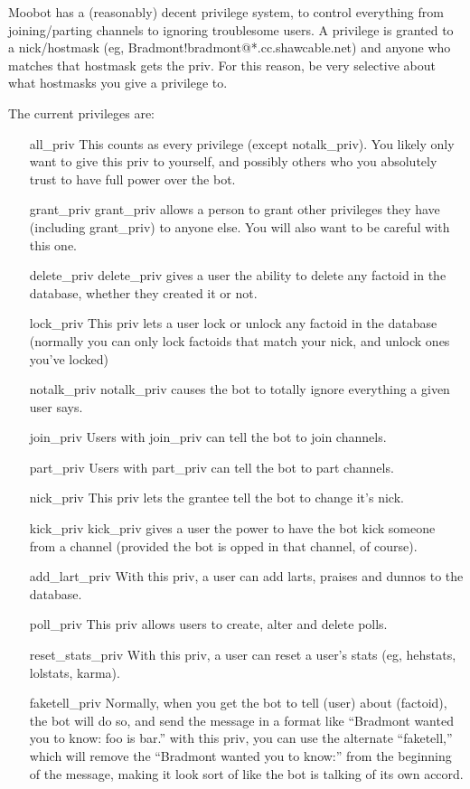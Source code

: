 \documentclass[titlepage]{article}
\begin{document}
		Moobot has a (reasonably) decent privilege system, to control
		everything from joining/parting channels to ignoring troublesome
		users.  A privilege is granted to a nick/hostmask (eg,
		Bradmont!bradmont@*.cc.shawcable.net) and anyone who matches that
		hostmask gets the priv.  For this reason, be very selective about what
		hostmasks you give a privilege to.

		The current privileges are:
		\begin{itemize}
			\item[all\_priv]  This counts as every privilege (except
			notalk\_priv).  You likely only want to give this priv to
			yourself, and possibly others who you absolutely trust to have
			full power over the bot.
			\item[grant\_priv]  grant\_priv allows a person to grant other
			privileges they have (including grant\_priv) to anyone else.  You
			will also want to be careful with this one.
			\item[delete\_priv]  delete\_priv gives a user the ability to
			delete any factoid in the database, whether they created it or
			not.
			\item[lock\_priv] This priv lets a user lock or unlock any factoid
			in the database (normally you can only lock factoids that match
			your nick, and unlock ones you've locked)
			\item[notalk\_priv] notalk\_priv causes the bot to totally ignore
			everything a given user says.
			\item[join\_priv]  Users with join\_priv can tell the bot to join
			channels.
			\item[part\_priv]  Users with part\_priv can tell the bot to part
			channels.
			\item[nick\_priv]  This priv lets the grantee tell the bot to
			change it's nick.
			\item[kick\_priv]  kick\_priv gives a user the power to have the
			bot kick someone from a channel (provided the bot is opped in that
			channel, of course).
			\item[add\_lart\_priv] With this priv, a user can add larts,
			praises and dunnos to the database.
			\item[poll\_priv]  This priv allows users to create, alter and
			delete polls.
			\item[reset\_stats\_priv]  With this priv, a user can reset a
			user's stats (eg, hehstats, lolstats, karma).
			\item[faketell\_priv] Normally, when you get the bot to tell
			(user) about (factoid), the bot will do so, and send the message
			in a format like ``Bradmont wanted you to know:  foo is bar.''
			with this priv, you can use the alternate ``faketell,'' which will
			remove the ``Bradmont wanted you to know:'' from the beginning of
			the message, making it look sort of like the bot is talking of its
			own accord.
		\end{itemize}
\end{document}
